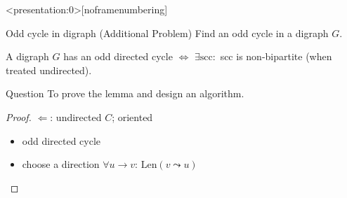 
\begin{frame}<presentation:0>[noframenumbering]
  \begin{exampleblock}{Odd cycle in digraph (Additional Problem)}
    Find an odd cycle in a digraph $G$.
  \end{exampleblock}

  \pause
  \begin{lemma}
    A digraph $G$ has an odd directed cycle $\iff$ $\exists \text{scc}: $ scc is non-bipartite (when treated undirected).
  \end{lemma}

  \pause
  \begin{alertblock}{Question}
	To prove the lemma and design an algorithm.
  \end{alertblock}
  \begin{proof}
    $\Longleftarrow$: undirected $C$; oriented
      \begin{itemize}
    	\item odd directed cycle
    	\item choose a direction $\forall u \to v$: $\text{Len}(v \leadsto u)$ 
      \end{itemize}
  \end{proof}
\end{frame}
